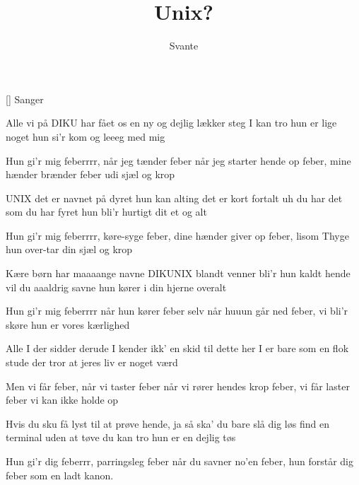 \documentclass[a4paper,11pt]{article}
\title{Unix?} %
\author{Svante}
\begin{document}
\maketitle

\begin{roles}
    [] Sanger
\end{roles}

\begin{song}
   Alle vi på DIKU har fået
            os en ny og dejlig lækker steg
            I kan tro hun er lige noget
            hun si'r kom og leeeg med mig

   Hun gi'r mig feberrrr, når jeg tænder
            feber når jeg starter hende op
            feber, mine hænder brænder
            feber udi sjæl og krop

   UNIX det er navnet på dyret
            hun kan alting det er kort fortalt
            uh du har det som du har fyret
            hun bli'r hurtigt dit et og alt

   Hun gi'r mig feberrrr, køre-syge 
            feber, dine hænder giver op
            feber, lisom Thyge 
            hun over-tar din sjæl og krop

   Kære børn har maaaange navne
            DIKUNIX blandt venner bli'r hun kaldt
            hende vil du aaaldrig savne
            hun kører i din hjerne overalt

   Hun gi'r mig feberrrr når hun kører
            feber selv når huuun går ned
            feber, vi bli'r skøre
            hun er vores kærlighed

   Alle I der sidder derude
            I kender ikk' en skid til dette her
            I er bare som en flok stude
            der tror at jeres liv er noget værd

   Men vi får feber, når vi taster
            feber når vi rører hendes krop
            feber, vi får laster
            feber vi kan ikke holde op

   Hvis du sku få lyst til at prøve
            hende, ja så ska' du bare slå dig løs
            find en terminal uden at tøve
            du kan tro hun er en dejlig tøs

   Hun gi'r dig feberrr, parringsleg
            feber når du savner no'en
            feber, hun forstår dig
            feber som en ladt kanon.


\end{song}
\end{document}

